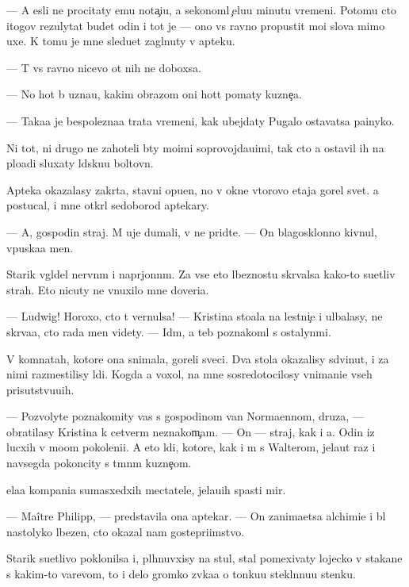 \documentclass[10pt]{book}
\begin{document}
— A {\y}esli ne procitaty {\y}emu nota{\c}i{\y}u, {\y}a sekonoml{\io} {\c}elu{\y}u minutu vremeni. Potomu cto itogov{\yi}{\y} rezulytat budet odin i tot je — ono vs{\e} ravno propustit mo{\y}i slova mimo uxe{\y}. K tomu je mne sledu{\y}et zagl{\ia}nuty v apteku.

— T{\yi} vs{\e} ravno nicevo ot nih ne dob{\y}oxsa.

— No hot{\ia} b{\yi} uzna{\y}u, kakim obrazom oni hot{\ia}t po{\y}maty kuzne{\c}a.

— Taka{\y}a je bespolezna{\y}a trata vremeni, kak ubejdaty Pugalo ostavatsa pa{\y}inyko{\y}.

Ni tot, ni drugo{\y} ne zahoteli b{\yi}ty mo{\y}imi soprovojda{\y}u{\x}imi, tak cto {\y}a ostavil ih na plo{\x}adi sluxaty l{\io}dsku{\y}u boltovn{\io}.

Apteka okazalasy zakr{\yi}ta, stavni opu{\x}en{\yi}, no v okne vtorovo etaja gorel svet. {\Y}a postucal, i mne otkr{\yi}l sedoborod{\yi}{\y} aptekary.

— A, gospodin straj. M{\yi} uje dumali, v{\yi} ne prid{\e}te. — On blagosklonno kivnul, vpuska{\y}a men{\ia}.

Starik v{\yi}gl{\ia}del nervn{\yi}m i napr{\ia}jonn{\yi}m. Za vse{\y} eto{\y} l{\io}beznost{\y}u skr{\yi}valsa kako{\y}-to su{\y}etliv{\yi}{\y} strah. Eto nicuty ne vnuxilo mne doveri{\y}a.

— Ludwig! Horoxo, cto t{\yi} vernulsa! — Kristina sto{\y}ala na lestni{\c}e i ul{\yi}balasy, ne skr{\yi}va{\y}a, cto rada men{\ia} videty. — Id{\e}m, {\y}a teb{\ia} poznakoml{\io} s ostalyn{\yi}mi.

V komnatah, ko\-to\-r{\yi}\-{\y}e ona snimala, goreli sveci. Dva stola okazalisy sdvinut{\yi}, i za nimi razmestilisy l{\io}di. Kogda {\y}a  voxol, na mne sosredotocilosy vnimani{\y}e vseh prisutstvu{\y}u{\x}ih.

— Pozvolyte poznakomity vas s gospodinom van Normaennom, druz{\y}a, — obratilasy Kristina k cetver{\yi}m neznakom{\c}am. — On — straj, kak i {\y}a. Odin iz lucxih v mo{\y}om pokoleni{\y}i. A eto l{\io}di, ko\-to\-r{\yi}\-{\y}e, kak i m{\yi} s Walterom, jela{\y}ut raz i navsegda pokoncity s t{\e}mn{\yi}m kuzne{\c}om.

{\C}ela{\y}a kompani{\y}a sumasxedxih mectatele{\y}, jela{\y}u{\x}ih spasti mir.

— Maître Philipp, — predstavila ona aptekar{\ia}. — On zanima{\y}etsa alchimi{\y}e{\y} i b{\yi}l nastolyko l{\io}bezen, cto okazal nam gostepri{\y}imstvo.

Starik su{\y}etlivo poklonilsa i, pl{\io}hnuvxisy na stul, stal pomexivaty lojecko{\y} v stakane s kakim-to varevom, to i delo gromko zv{\ia}ka{\y}a o tonku{\y}u stekl{\ia}nnu{\y}u stenku.
\end{document}
